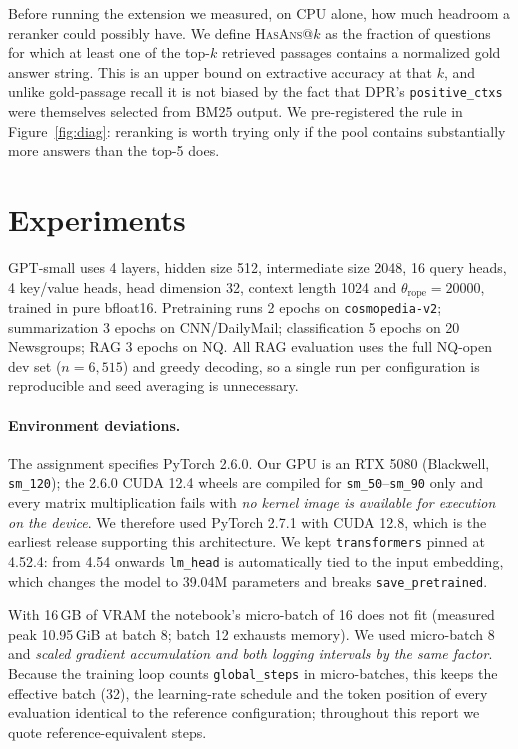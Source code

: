 \documentclass[11pt]{article}
\makeatletter
\newcommand{\hasans}{\textsc{HasAns}@$k$}
\makeatother
\begin{document}
Before running the extension we measured, on CPU alone, how much headroom a reranker could
possibly have. We define \hasans{} as the fraction of questions for which at least one of the
top-$k$ retrieved passages contains a normalized gold answer string. This is an upper bound on
extractive accuracy at that $k$, and unlike gold-passage recall it is not biased by the fact
that DPR's \texttt{positive\_ctxs} were themselves selected from BM25 output. We pre-registered
the rule in Figure~\ref{fig:diag}: reranking is worth trying only if the pool contains
substantially more answers than the top-5 does.

\section{Experiments}

GPT-small uses 4 layers, hidden size 512, intermediate size 2048, 16 query heads, 4 key/value
heads, head dimension 32, context length 1024 and $\theta_{\text{rope}}=20000$, trained in pure
bfloat16. Pretraining runs 2 epochs on \texttt{cosmopedia-v2}; summarization 3 epochs on
CNN/DailyMail; classification 5 epochs on 20 Newsgroups; RAG 3 epochs on NQ. All RAG evaluation
uses the full NQ-open dev set ($n=6{,}515$) and greedy decoding, so a single run per
configuration is reproducible and seed averaging is unnecessary.

\paragraph{Environment deviations.} The assignment specifies PyTorch 2.6.0. Our GPU is an RTX
5080 (Blackwell, \texttt{sm\_120}); the 2.6.0 CUDA 12.4 wheels are compiled for
\texttt{sm\_50}--\texttt{sm\_90} only and every matrix multiplication fails with
\emph{no kernel image is available for execution on the device}. We therefore used PyTorch
2.7.1 with CUDA 12.8, which is the earliest release supporting this architecture. We kept
\texttt{transformers} pinned at 4.52.4: from 4.54 onwards \texttt{lm\_head} is automatically
tied to the input embedding, which changes the model to 39.04M parameters and breaks
\texttt{save\_pretrained}.

With 16\,GB of VRAM the notebook's micro-batch of 16 does not fit (measured peak 10.95\,GiB at
batch 8; batch 12 exhausts memory). We used micro-batch 8 and \emph{scaled gradient
accumulation and both logging intervals by the same factor}. Because the training loop counts
\texttt{global\_steps} in micro-batches, this keeps the effective batch (32), the learning-rate
schedule and the token position of every evaluation identical to the reference configuration;
throughout this report we quote reference-equivalent steps.
\end{document}
